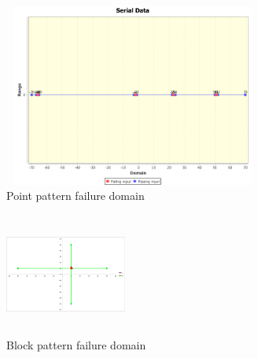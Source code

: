 \documentclass{acm_proc_article-sp}
\begin{document}
\begin{figure}[htp]
\centering
\includegraphics[width=8.5cm,height=6cm]{oneArgumentPointDomain.png}
\caption{Point pattern failure domain}
\label{fig:patterns}
\end{figure}




\begin{figure}[htp]
\centering
\includegraphics[width=4cm,height=4cm]{block_pattern.png}
\caption{Block pattern failure domain}
\label{fig:patterns}
\end{figure}



\end{document}
